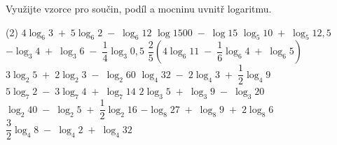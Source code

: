\begin{exercise}
    Využijte vzorce pro součin, podíl a mocninu uvnitř logaritmu.
    \begin{tasks}(2)
        \task $4\log_6 3 \;+\; 5\log_6 2 \;-\; \log_6 12$
        \task $\log 1500 \;-\; \log 15$
        \task $\log_5 10 \;+\; \log_5 12{,}5$
        \task $-\log_3 4 \;+\; \log_3 6 \;-\; \dfrac{1}{4} \log_3 0{,}5$
        \task $\dfrac{2}{5} \left( 4\log_6 11 \;-\; \dfrac{1}{6} \log_6 4 \;+\; \log_6 5 \right)$
        \task $3\log_2 5 \;+\; 2\log_2 3 \;-\; \log_2 60$
        \task $\log_4 32 \;-\; 2\log_4 3 \;+\; \dfrac{1}{2} \log_4 9$
        \task $5\log_7 2 \;-\; 3\log_7 4 \;+\; \log_7 14$
        \task $2\log_3 5 \;+\; \log_3 9 \;-\; \log_3 20$
        \task $\log_2 40 \;-\; \log_2 5 \;+\; \dfrac{1}{2} \log_2 16$
        \task $-\log_8 27 \;+\; \log_8 9 \;+\; 2\log_8 6$
        \task $\dfrac{3}{2} \log_4 8 \;-\; \log_4 2 \;+\; \log_4 32$
    \end{tasks}
\end{exercise}


